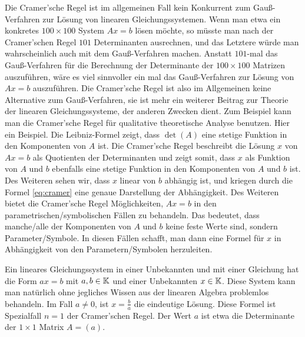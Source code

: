 	Die Cramer'sche Regel ist im allgemeinen Fall kein Konkurrent zum Gauß-Verfahren zur Lösung von linearen Gleichungssystemen. Wenn man etwa ein konkretes $100 \times 100$ System $A x = b$ lösen möchte, so müsste man nach der Cramer'schen Regel $101$ Determinanten ausrechnen, und das Letztere würde man wahrscheinlich auch mit dem Gauß-Verfahren machen. Anstatt $101$-mal das Gauß-Verfahren für die Berechnung der Determinante der $100 \times 100$ Matrizen auszuführen, wäre es viel sinnvoller ein mal das Gauß-Verfahren zur Lösung von $A x =b$ auszuführen. Die Cramer'sche Regel ist also im Allgemeinen keine Alternative zum Gauß-Verfahren, sie ist mehr ein weiterer Beitrag zur Theorie der linearen Gleichungssysteme, der anderen Zwecken dient. Zum Beispiel kann man die Cramer'sche Regel für qualitative theoretische Analyse benutzen. Hier ein Beispiel. Die Leibniz-Formel zeigt, dass $\det(A)$ eine stetige Funktion in den Komponenten von $A$ ist. Die Cramer'sche Regel beschreibt die Lösung $x$ von $A x =b $ als Quotienten der Determinanten und zeigt somit, dass $x$ als Funktion von $A$ und $b$ ebenfalls eine stetige Funktion in den Komponenten von $A$ und $b$ ist. Des Weiteren sehen wir, dass $x$ linear von $b$ abhängig ist, und kriegen durch die Formel \eqref{eq:cramer} eine genaue Darstellung der Abhängigkeit. Des Weiteren bietet die Cramer'sche Regel Möglichkeiten, $A x = b$ in den parametrischen/symbolischen Fällen zu behandeln. Das bedeutet, dass manche/alle der Komponenten von $A$ und $b$ keine feste Werte sind, sondern Parameter/Symbole. In diesen Fällen schafft, man dann eine Formel für $x$ in Abhängigkeit von den Parametern/Symbolen herzuleiten. 
	
\begin{bsp}
	Ein lineares Gleichungssystem in einer Unbekannten und mit einer Gleichung hat die Form $a x = b$ mit $a, b \in \mathbb K$ und einer Unbekannten $x \in \mathbb K$. Diese System kann man natürlich ohne jegliches Wissen aus der linearen Algebra problemlos behandeln. Im Fall $a \ne 0$, ist $x = \frac{b}{a}$ die eindeutige Lösung. Diese Formel ist Spezialfall $n=1$ der Cramer'schen Regel. Der Wert $a$ ist etwa die Determinante der $1 \times 1$ Matrix $A = (a )$. 
\end{bsp}

